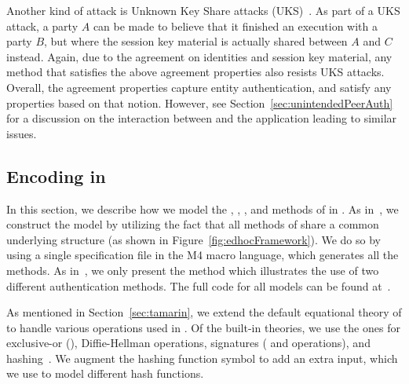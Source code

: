 Another kind of attack is Unknown Key Share attacks
(UKS)~\cite{DBLP:conf/ima/Blake-WilsonJM97}.
%
As part of a UKS attack, a party $A$ can be made to believe that it finished
an execution with a party $B$, but where the session key material is actually
shared between $A$ and $C$ instead.
%
Again, due to the agreement on identities and session key material, any method
that satisfies the above agreement properties also resists UKS attacks.
%
Overall, the agreement properties capture entity authentication,
and satisfy any properties based on that notion.
%
However, see Section~\ref{sec:unintendedPeerAuth} for a discussion on the
interaction between \mEdhoc{} and the application leading to similar issues.
%

\subsection{Encoding \mEdhoc{} in \mTamarin}
\label{sec:modeling}
%
In this section, we describe how we model the \mSigSig, \mSigStat, \mStatSig,
and \mStatStat{} methods of \mEdhoc{} in \mTamarin.
%
As in~\cite{Norr21}, we construct the \mTamarin{} model by utilizing the fact
that all methods of \mEdhoc{} share a common underlying structure
(as shown in Figure~\ref{fig:edhocFramework}).
%
We do so by using a single specification file in the M4 macro language,
which generates all the methods.
%
As in~\cite{Norr21}, we only present the \mStatSig{} method which illustrates
the use of two different authentication methods.
%
The full \mTamarin{} code for all models can be found at~\cite{edhocTamarinRepo}.
%

As mentioned in Section~\ref{sec:tamarin}, we extend the default
equational theory of \mTamarin{} to handle various operations used in \mEdhoc.
%
Of the built-in theories, we use the ones for exclusive-or (\mXor),
Diffie-Hellman operations, signatures ( and  operations),
and hashing~\cite{DBLP:conf/csfw/DreierHRS18,DBLP:conf/csfw/SchmidtMCB12}.
%
We augment the hashing function symbol to add an extra input, which we use to
model different hash functions.
%

